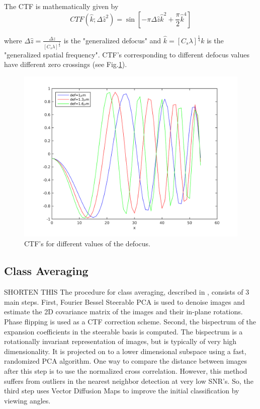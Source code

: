 \documentclass{article}
\begin{document}
The CTF is mathematically given by \cite{frankctf}
\begin{equation}
CTF(\hat{k};\Delta\hat{z}^2)= \sin[-\pi \Delta\hat{z}\hat{k}^2 + \frac{\pi}{2} \hat{k}^4]
\label{eq:ctf}
\end{equation}

where 
$\Delta\hat{z}=\frac{\Delta z}{[C_s \lambda]^{\frac{1}{2}}}$ is the "generalized defocus" and $\hat{k}=[C_s \lambda]^{\frac{1}{4}}k$ is the "generalized spatial frequency". CTF's corresponding to different defocus values have different zero crossings (see Fig.\ref{fig:ctf}).

\begin{figure}
\begin{center}
\includegraphics[scale=0.5]{ctfeg_fig.png}
\caption{CTF's for different values of the defocus.}\label{fig:ctf}
\end{center}

\end{figure}


\subsection{Class Averaging}
{\color{red} SHORTEN THIS}
The procedure for class averaging, described in \cite{zhao}, consists of 3 main steps. First, Fourier Bessel Steerable PCA is used to denoise images and estimate the 2D covariance matrix of the images and their in-plane rotations. Phase flipping is used as a CTF correction scheme. Second, the bispectrum of the expansion coefficients in the steerable basis is computed. The bispectrum is a rotationally invariant representation of images, but is typically of very high dimensionality. It is projected on to a lower dimensional subspace using a fast, randomized PCA algorithm. One way to compare the distance between images after this step is to use the normalized cross correlation. However, this method suffers from outliers in the nearest neighbor detection at very low SNR's. So, the third step uses Vector Diffusion Maps to improve the initial classification by viewing angles.
\end{document}
